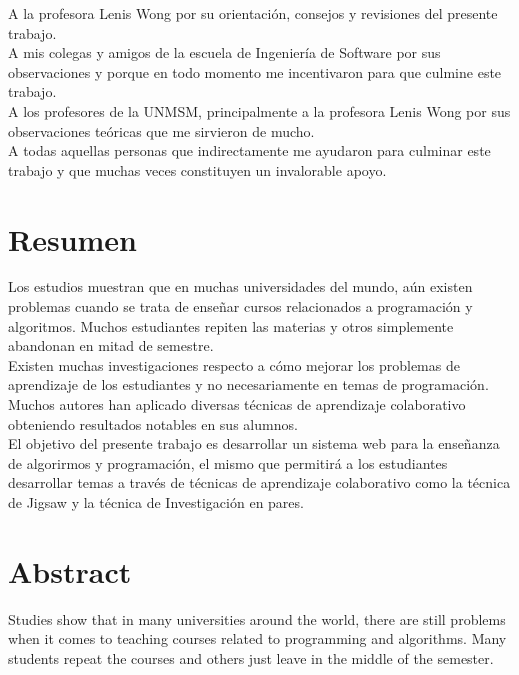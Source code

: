 A la profesora Lenis Wong por su orientación, consejos  y revisiones del presente trabajo.\\

A mis colegas y amigos de la escuela de Ingeniería de Software por sus observaciones y porque en todo momento me incentivaron para que culmine este trabajo.\\

A los profesores de la UNMSM, principalmente a la profesora Lenis Wong por sus observaciones teóricas que me sirvieron de mucho.\\

A todas aquellas personas que indirectamente me ayudaron para culminar este trabajo y que muchas veces constituyen un invalorable apoyo.\\

\chapter*{Resumen}

Los estudios muestran que en muchas universidades del mundo, aún existen problemas cuando se trata de enseñar cursos relacionados a programación y algoritmos. Muchos estudiantes repiten las materias y otros simplemente abandonan en mitad de semestre.\\

Existen muchas investigaciones respecto a cómo mejorar los problemas de aprendizaje de los estudiantes y no necesariamente en temas de programación. Muchos autores han aplicado diversas técnicas de aprendizaje colaborativo obteniendo resultados notables en sus alumnos.\\

El objetivo del presente trabajo es desarrollar un sistema web para la enseñanza de algorirmos y programación, el mismo que permitirá a los estudiantes desarrollar temas a través de técnicas de aprendizaje colaborativo como la técnica de Jigsaw y la técnica de Investigación en pares.

\chapter*{Abstract}
Studies show that in many universities around the world, there are still problems when it comes to teaching courses related to programming and algorithms. Many students repeat the courses and others just leave in the middle of the semester. \\

